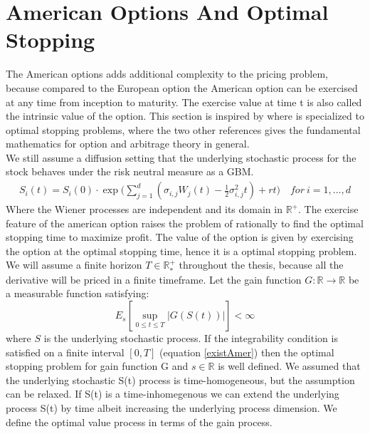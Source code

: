 
\section{American Options And Optimal Stopping}\label{AmericanOptions}
The American options adds additional complexity to the pricing problem, because compared to the European option the American option can be exercised at any time from inception to maturity. The exercise value at time t is also called the intrinsic value of the option. This section is inspired by \parencite{finKont, Shiryaev06,Elliott99} where \parencite{Shiryaev06} is specialized to optimal stopping problems, where the two other references gives the fundamental mathematics for option and arbitrage theory in general.\\

We still assume a diffusion setting that the underlying stochastic process for the stock behaves under the risk neutral measure as a GBM.
\begin{equation*}
\begin{split}
S_i(t)=S_i(0) \cdot \exp \bigg( \sum_{j=1}^{d}(\sigma_{i,j} W_j(t) -\frac{1}{2} \sigma_{i,j}^2 t) + rt \bigg) \quad  for \ i=1,\ldots,d
\end{split}
\end{equation*}
Where the Wiener processes are independent and its domain in $\mathbb{R}^+$. The exercise feature of the american option raises the problem of rationally to find the optimal stopping time to maximize profit. The value of the option is given by exercising the option at the optimal stopping time, hence it is a optimal stopping problem. We will assume a finite horizon $T\in \mathbb{R}_*^+$ throughout the thesis, because all the derivative will be priced in a finite timeframe. Let the gain function $G:\mathbb{R}\to \mathbb{R}$ be a measurable function satisfying:
\begin{equation}\label{existAmer}
E_{s}[\sup_{0\leq t \leq T}|G(S(t))|] < \infty
\end{equation}
where $S$ is the underlying stochastic process. If the integrability condition is satisfied on a finite interval $[0,T]$ (equation \eqref{existAmer}) then the optimal stopping problem for gain function G and $s \in \mathbb{R}$ is well defined. We assumed that the underlying stochastic S(t) process is time-homogeneous, but the assumption can be relaxed. If S(t) is a time-inhomegenous we can extend the underlying process S(t) by time albeit increasing the underlying process dimension. We define the optimal value process in terms of the gain process.

